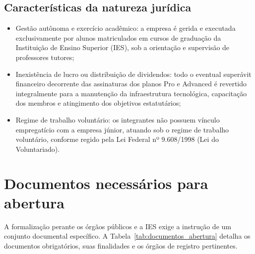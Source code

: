 \documentclass[
  12pt,
  openright,
  oneside,
  a4paper,
  brazilian
]{abntex2}
\begin{document}
\subsection{Características da natureza jurídica}
\begin{itemize}
    \item{Gestão autônoma e exercício acadêmico:} a empresa é gerida e executada exclusivamente por alunos matriculados em cursos de graduação da Instituição de Ensino Superior (IES), sob a orientação e supervisão de professores tutores;
    \item{Inexistência de lucro ou distribuição de dividendos:} todo o eventual superávit financeiro decorrente das assinaturas dos planos Pro e Advanced é revertido integralmente para a manutenção da infraestrutura tecnológica, capacitação dos membros e atingimento dos objetivos estatutários;
    \item{Regime de trabalho voluntário:} os integrantes não possuem vínculo empregatício com a empresa júnior, atuando sob o regime de trabalho voluntário, conforme regido pela Lei Federal nº 9.608/1998 (Lei do Voluntariado).
\end{itemize}

\section{Documentos necessários para abertura}
\label{sec:documentos_abertura}

A formalização perante os órgãos públicos e a IES exige a instrução de um conjunto documental específico. A Tabela~\ref{tab:documentos_abertura} detalha os documentos obrigatórios, suas finalidades e os órgãos de registro pertinentes.
\end{document}
